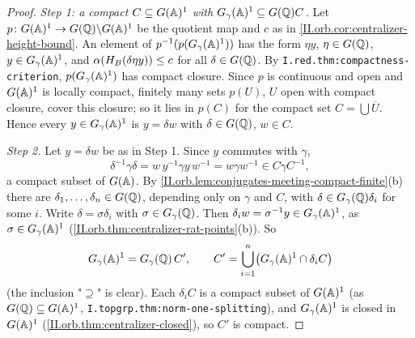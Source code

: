 \begin{lemma}
\end{lemma}
\begin{proof}
\emph{Step 1: a compact $C\subseteq G(\mathbb{A})^1$ with $G_\gamma(\mathbb{A})^1\subseteq G(\mathbb{Q})C$.} Let $p\colon G(\mathbb{A})^1\to G(\mathbb{Q})\backslash G(\mathbb{A})^1$ be the quotient map and
$c$ as in \cref{II.orb.cor:centralizer-height-bound}. An element of $p^{-1}(p(G_\gamma(\mathbb{A})^1))$ has the form $\eta y$, $\eta\in G(\mathbb{Q})$,
$y\in G_\gamma(\mathbb{A})^1$, and $\alpha(H_B(\delta\eta y))\le c$ for all $\delta\in G(\mathbb{Q})$. By \texttt{I.red.thm:compactness-criterion}, $p(G_\gamma(\mathbb{A})^1)$ has
compact closure. Since $p$ is continuous and open and $G(\mathbb{A})^1$ is locally compact, finitely many sets $p(U)$, $U$ open with compact
closure, cover this closure; so it lies in $p(C)$ for the compact set $C=\bigcup\overline U$. Hence every $y\in G_\gamma(\mathbb{A})^1$ is $y=\delta w$ with
$\delta\in G(\mathbb{Q})$, $w\in C$.

\emph{Step 2.} Let $y=\delta w$ be as in Step 1. Since $y$ commutes with $\gamma$,
\[
  \delta^{-1}\gamma\delta=w\,y^{-1}\gamma y\,w^{-1}=w\gamma w^{-1}\in C\gamma C^{-1},
\]
a compact subset of $G(\mathbb{A})$. By \cref{II.orb.lem:conjugates-meeting-compact-finite}(b) there are $\delta_1,\dots,\delta_n\in G(\mathbb{Q})$, depending
only on $\gamma$ and $C$, with $\delta\in G_\gamma(\mathbb{Q})\delta_i$ for some $i$. Write $\delta=\sigma\delta_i$ with $\sigma\in G_\gamma(\mathbb{Q})$. Then
$\delta_iw=\sigma^{-1}y\in G_\gamma(\mathbb{A})^1$, as $\sigma\in G_\gamma(\mathbb{A})^1$ (\cref{II.orb.thm:centralizer-rat-points}(b)). So
\[
  G_\gamma(\mathbb{A})^1=G_\gamma(\mathbb{Q})\,C',\qquad C'=\bigcup_{i=1}^n\bigl(G_\gamma(\mathbb{A})^1\cap\delta_iC\bigr)
\]
(the inclusion "$\supseteq$" is clear). Each $\delta_iC$ is a compact subset of $G(\mathbb{A})^1$ (as $G(\mathbb{Q})\subseteq G(\mathbb{A})^1$,
\texttt{I.topgrp.thm:norm-one-splitting}), and $G_\gamma(\mathbb{A})^1$ is closed in $G(\mathbb{A})^1$ (\cref{II.orb.thm:centralizer-closed}), so $C'$ is compact.
\end{proof}

